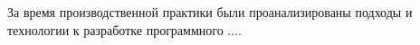 \label{sec:practice:conclusion}
За время производственной практики были проанализированы подходы и технологии к разработке программного ....
